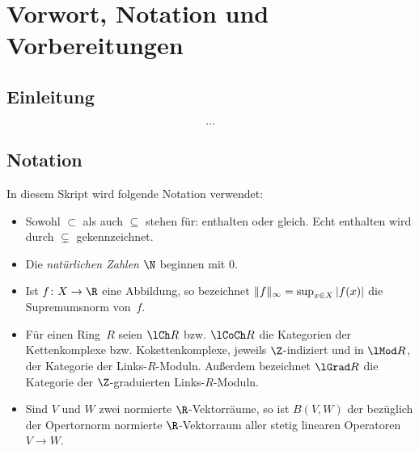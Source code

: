 
\chapter{Vorwort, Notation und Vorbereitungen}
\section{Einleitung}
\[ \dots \] %

\section{Notation}
In diesem Skript wird folgende Notation verwendet:
\begin{itemize}
    \item
        Sowohl $\subset$ als auch $\subseteq$ stehen für: enthalten oder gleich.
        Echt enthalten wird durch $\subsetneq$ gekennzeichnet.
    
    \item
        Die \emph{natürlichen Zahlen $\N$} beginnen mit $0$.

    \item
        Ist $f\colon X\to\R$ eine Abbildung, so bezeichnet
        $\lVert f\rVert_\infty = \sup_{x\in X}\,\lvert f(x)\rvert$ die
        Supremumsnorm von~$f$.

    \item
        Für einen Ring~$R$ seien $\lCh R$ bzw. $\lCoCh R$
        die Kategorien der Kettenkomplexe bzw. Kokettenkomplexe, jeweils
        $\Z$-indiziert und in $\lMod R$, der Kategorie der Links-$R$-Moduln.
        Außerdem bezeichnet $\lGrad R$ die Kategorie der $\Z$-graduierten
        Links-$R$-Moduln.

    \item
        Sind $V$ und $W$ zwei normierte $\R$-Vektorräume, so ist
        $B(V,W)$ der bezüglich der Opertornorm normierte $\R$-Vektorraum
        aller stetig linearen Operatoren $V\to W$.
\end{itemize}

